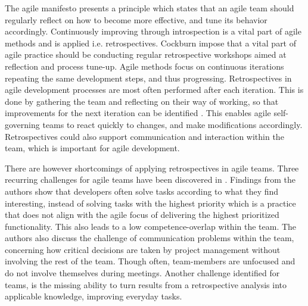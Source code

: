 The agile manifesto presents a principle which states that an agile team should regularly reflect on how to become more effective, and tune its behavior accordingly\citep{Beck2001}. Continuously improving through introspection is a vital part of agile methods and is applied i.e. retrospectives\citep{Beck1999, Derby2006, Maham2008}. Cockburn impose that a vital part of agile practice should be conducting regular retrospective workshops aimed at reflection and process tune-up\citep{Cockburn2006}. Agile methods focus on continuous iterations repeating the same development steps, and thus progressing. Retrospectives in agile development processes are most often performed after each iteration. This is done by gathering the team and reflecting on their way of working, so that improvements for the next iteration can be identified \citep{Derby2006, Drury2011}. This enables agile self-governing teams to react quickly to changes, and make modifications accordingly\citep{Drury2011}. Retrospectives could also support communication and interaction within the team, which is important for agile development. 
 
There are however shortcomings of applying retrospectives in agile teams. Three recurring challenges for agile teams have been discovered in \citep{straymoechallenges}. Findings from the authors show that developers often solve tasks according to what they find interesting, instead of solving tasks with the highest priority which is a practice that does not align with the agile focus of delivering the highest prioritized functionality. This also leads to a low competence-overlap within the team. The authors also discuss the challenge of communication problems within the team, concerning how critical decisions are taken by project management without involving the rest of the team. Though often, team-members are unfocused and do not involve themselves during meetings. Another challenge identified for teams, is the missing ability to turn results from a retrospective analysis into applicable knowledge, improving everyday tasks. 

